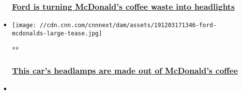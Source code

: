 \begin{itemize}
  \hypertarget{ford-is-turning-mcdonalds-coffee-waste-into-headlights-}{%
  \subsubsection{\texorpdfstring{\href{/2019/12/04/business/ford-mcdonalds-coffee-chaff/index.html}{Ford
  is turning McDonald's coffee waste into headlights
  }}{Ford is turning McDonald's coffee waste into headlights }}\label{ford-is-turning-mcdonalds-coffee-waste-into-headlights-}}
\item
  \href{/videos/business/2019/12/03/ford-mcdonalds-coffee-bean-headlamps-orig.cnn}{}

  \texttt{[image: //cdn.cnn.com/cnnnext/dam/assets/191203171346-ford-mcdonalds-large-tease.jpg]}

  **

  \hypertarget{this-cars-headlamps-are-made-out-of-mcdonalds-coffee}{%
  \subsubsection{\texorpdfstring{\href{/videos/business/2019/12/03/ford-mcdonalds-coffee-bean-headlamps-orig.cnn}{This
  car's headlamps are made out of McDonald's
  coffee}}{This car's headlamps are made out of McDonald's coffee}}\label{this-cars-headlamps-are-made-out-of-mcdonalds-coffee}}
\item
\end{itemize}


